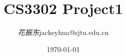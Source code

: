 \documentclass[12pt,a4paper]{ctexart}
\title{\textbf{CS3302 Project1}} %
\author{
\begin{tabular}{ll}
  \textit{花振东} & jackeyhua@sjtu.edu.cn \\
\end{tabular}
}
\date{\today} %
\begin{document}
\maketitle %

\tableofcontents


\pagebreak


%
%

\pagebreak


%
%
\end{document}
